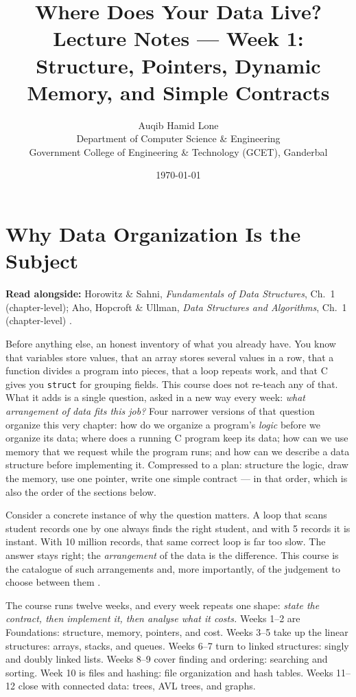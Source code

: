 \documentclass[11pt]{article}
\title{Where Does Your Data Live?\\\large Lecture Notes --- Week 1: Structure, Pointers, Dynamic Memory, and Simple Contracts}
\author{Auqib Hamid Lone\\[0.3em]
  \small Department of Computer Science \& Engineering\\
  \small Government College of Engineering \& Technology (GCET), Ganderbal}
\date{\today}
\begin{document}
\maketitle

\section{Why Data Organization Is the Subject}

\textbf{Read alongside:} Horowitz \& Sahni, \textit{Fundamentals of Data Structures}, Ch.~1 (chapter-level); Aho, Hopcroft \& Ullman, \textit{Data Structures and Algorithms}, Ch.~1 (chapter-level) \cite{AhoHopcroftUllman1983_data_structures_algorithms}.

Before anything else, an honest inventory of what you already have. You know
that variables store values, that an array stores several values in a row,
that a function divides a program into pieces, that a loop repeats work, and
that C gives you \texttt{struct} for grouping fields. This course does not
re-teach any of that. What it adds is a single question, asked in a new way
every week: \emph{what arrangement of data fits this job?} Four narrower
versions of that question organize this very chapter: how do we organize a
program's \emph{logic} before we organize its data; where does a running C
program keep its data; how can we use memory that we request while the
program runs; and how can we describe a data structure before implementing
it. Compressed to a plan: structure the logic, draw the memory, use one
pointer, write one simple contract --- in that order, which is also the
order of the sections below.

Consider a concrete instance of why the question matters. A loop that scans
student records one by one always finds the right student, and with 5
records it is instant. With 10 million records, that same correct loop is
far too slow. The answer stays right; the \emph{arrangement} of the data is
the difference. This
course is the catalogue of such arrangements and, more importantly, of the
judgement to choose between them
\cite{HorowitzSahni2008_fundamentals_data_structures,AhoHopcroftUllman1983_data_structures_algorithms}.

The course runs twelve weeks, and every week repeats one shape: \emph{state
the contract, then implement it, then analyse what it costs.} Weeks 1--2 are
Foundations: structure, memory, pointers, and cost.
Weeks 3--5 take up the linear structures: arrays, stacks, and queues. Weeks
6--7 turn to linked structures: singly and doubly linked lists. Weeks 8--9
cover finding and ordering: searching and sorting. Week 10 is files and
hashing: file organization and hash tables. Weeks 11--12 close with
connected data: trees, AVL trees, and graphs.
\end{document}
